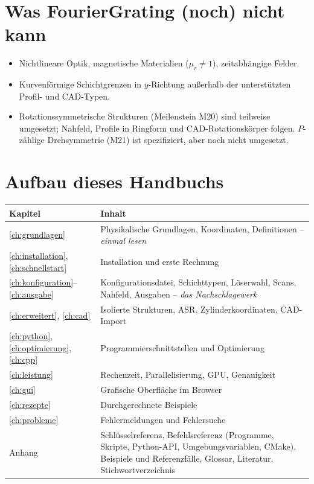 \section{Was FourierGrating (noch) nicht kann}
\begin{itemize}
  \item Nichtlineare Optik, magnetische Materialien ($\mu_r\neq1$), zeitabhängige Felder.
  \item Kurvenförmige Schichtgrenzen in $y$-Richtung außerhalb der unterstützten Profil- und CAD-Typen.
  \item Rotationssymmetrische Strukturen (Meilenstein M20) sind teilweise umgesetzt; Nahfeld, Profile in Ringform
        und CAD-Rotationskörper folgen. $P$-zählige Drehsymmetrie (M21) ist spezifiziert, aber noch nicht umgesetzt.
\end{itemize}

\section{Aufbau dieses Handbuchs}
\begin{center}
\small
\begin{tabularx}{\linewidth}{lY}
\toprule
Kapitel & Inhalt \\
\midrule
\ref{ch:grundlagen} & Physikalische Grundlagen, Koordinaten, Definitionen -- \emph{einmal lesen} \\
\ref{ch:installation}, \ref{ch:schnellstart} & Installation und erste Rechnung \\
\ref{ch:konfiguration}--\ref{ch:ausgabe} & Konfigurationsdatei, Schichttypen, Löserwahl, Scans, Nahfeld, Ausgaben
-- \emph{das Nachschlagewerk} \\
\ref{ch:erweitert}, \ref{ch:cad} & Isolierte Strukturen, ASR, Zylinderkoordinaten, CAD-Import \\
\ref{ch:python}, \ref{ch:optimierung}, \ref{ch:cpp} & Programmierschnittstellen und Optimierung \\
\ref{ch:leistung} & Rechenzeit, Parallelisierung, GPU, Genauigkeit \\
\ref{ch:gui} & Grafische Oberfläche im Browser \\
\ref{ch:rezepte} & Durchgerechnete Beispiele \\
\ref{ch:probleme} & Fehlermeldungen und Fehlersuche \\
Anhang & Schlüsselreferenz, Befehlsreferenz (Programme, Skripte, Python-API, Umgebungsvariablen, CMake), Beispiele
und Referenzfälle, Glossar, Literatur, Stichwortverzeichnis \\
\bottomrule
\end{tabularx}
\end{center}

